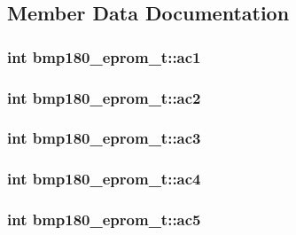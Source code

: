 \subsection{Member Data Documentation}
\hypertarget{structbmp180__eprom__t_ae588ab126a5cc122d31b032868d90722}{
\subsubsection[{ac1}]{\setlength{\rightskip}{0pt plus 5cm}int bmp180\+\_\+eprom\+\_\+t\+::ac1}}\label{structbmp180__eprom__t_ae588ab126a5cc122d31b032868d90722}
\hypertarget{structbmp180__eprom__t_a8d47f8518ac03f436daa901ca39ec94d}{
\subsubsection[{ac2}]{\setlength{\rightskip}{0pt plus 5cm}int bmp180\+\_\+eprom\+\_\+t\+::ac2}}\label{structbmp180__eprom__t_a8d47f8518ac03f436daa901ca39ec94d}
\hypertarget{structbmp180__eprom__t_afab9b64c45c424fbc53a831ea89bdfa1}{
\subsubsection[{ac3}]{\setlength{\rightskip}{0pt plus 5cm}int bmp180\+\_\+eprom\+\_\+t\+::ac3}}\label{structbmp180__eprom__t_afab9b64c45c424fbc53a831ea89bdfa1}
\hypertarget{structbmp180__eprom__t_a78dccc67e89521c40cccadbd97e53638}{
\subsubsection[{ac4}]{\setlength{\rightskip}{0pt plus 5cm}int bmp180\+\_\+eprom\+\_\+t\+::ac4}}\label{structbmp180__eprom__t_a78dccc67e89521c40cccadbd97e53638}
\hypertarget{structbmp180__eprom__t_aeea9752a477d8f18fbb62b0c89df4fd8}{
\subsubsection[{ac5}]{\setlength{\rightskip}{0pt plus 5cm}int bmp180\+\_\+eprom\+\_\+t\+::ac5}}\label{structbmp180__eprom__t_aeea9752a477d8f18fbb62b0c89df4fd8}
